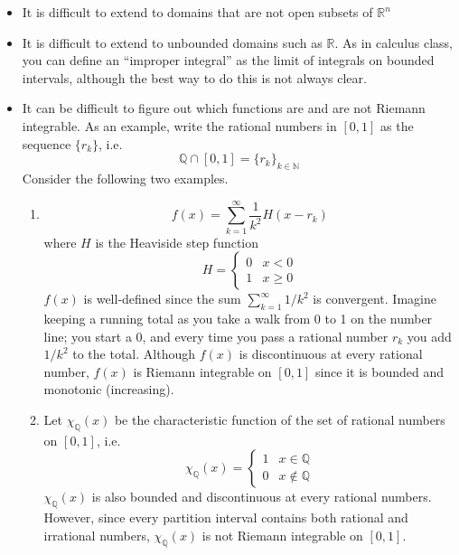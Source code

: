 \documentclass[12pt]{amsart}         %
\theoremstyle{remark}
\newcommand{\N}{\mathbb{N}}
\newcommand{\R}{\mathbb{R}}
\newcommand{\Q}{\mathbb{Q}}
\begin{document}
\begin{itemize}
    \item It is difficult to extend to domains that are not open subsets of $\R^n$
    \item It is difficult to extend to unbounded domains such as $\R$. As in calculus class, you can define an ``improper integral'' as the limit of integrals on bounded intervals, although the best way to do this is not always clear.
    \item It can be difficult to figure out which functions are and are not Riemann integrable. As an example, write the rational numbers in $[0, 1]$ as the sequence $\{ r_k \}$, i.e.
    \[
    \Q \cap [0, 1] = \{ r_k \}_{k \in \N}
    \]
    Consider the following two examples.
    \begin{enumerate}
        \item 
        \[
        f(x) = \sum_{k=1}^\infty \frac{1}{k^2}H(x - r_k)
        \]
        where $H$ is the Heaviside step function
        \[
        H = \begin{cases}
        0 & x < 0 \\
        1 & x \geq 0
        \end{cases}
        \]
        $f(x)$ is well-defined since the sum $\sum_{k=1}^\infty 1/k^2$ is convergent. Imagine keeping a running total as you take a walk from 0 to 1 on the number line; you start a 0, and every time you pass a rational number $r_k$ you add $1/k^2$ to the total. Although $f(x)$ is discontinuous at every rational number, $f(x)$ is Riemann integrable on $[0, 1]$ since it is bounded and monotonic (increasing).
        \item Let $\chi_\Q(x)$ be the characteristic function of the set of rational numbers on $[0, 1]$, i.e.
        \[
        \chi_\Q(x) = 
        \begin{cases}
        1 & x \in \Q \\
        0 & x \notin \Q
        \end{cases}
        \]
        $\chi_\Q(x)$ is also bounded and discontinuous at every rational numbers. However, since every partition interval contains both rational and irrational numbers, $\chi_\Q(x)$ is not Riemann integrable on $[0, 1]$.
    \end{enumerate}
    

\end{itemize}
\end{document}

